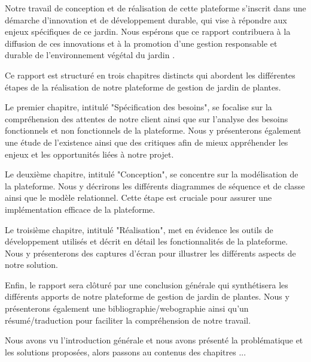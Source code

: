 \documentclass[a4paper,12pt,oneside]{article}
\begin{document}
{Notre travail de conception et de réalisation de cette plateforme  s'inscrit dans une démarche d'innovation et de développement durable, qui vise à répondre aux enjeux spécifiques de ce jardin. Nous espérons que ce rapport contribuera à la diffusion de ces innovations et à la promotion d'une gestion responsable et durable de l'environnement végétal du jardin .
\vskip1mm

Ce rapport est structuré en trois chapitres distincts qui abordent les différentes étapes de la réalisation de notre plateforme de gestion de jardin de plantes.
\vskip1mm

Le premier chapitre, intitulé "Spécification des besoins", se focalise sur la compréhension des attentes de notre client ainsi que sur l'analyse des besoins fonctionnels et non fonctionnels de la plateforme. Nous y présenterons également une étude de l'existence ainsi que des critiques afin de mieux appréhender les enjeux et les opportunités liées à notre projet.
\vskip1mm

Le deuxième chapitre, intitulé "Conception", se concentre sur la modélisation de la plateforme. Nous y décrirons les différents diagrammes de séquence et de classe ainsi que le modèle relationnel. Cette étape est cruciale pour assurer une implémentation efficace de la plateforme.
\vskip1mm

Le troisième chapitre, intitulé "Réalisation", met en évidence les outils de développement utilisés et décrit en détail les fonctionnalités de la plateforme. Nous y présenterons des captures d'écran pour illustrer les différents aspects de notre solution.
\vskip1mm

Enfin, le rapport sera clôturé par une conclusion générale qui synthétisera les différents apports de notre plateforme de gestion de jardin de plantes. Nous y présenterons également une bibliographie/webographie ainsi qu'un résumé/traduction pour faciliter la compréhension de notre travail.
\vskip2mm

Nous avons vu l’introduction générale et nous avons présenté
la problématique et les solutions proposées, alors passons au contenus des chapitres ...

}

\newpage
\end{document}
